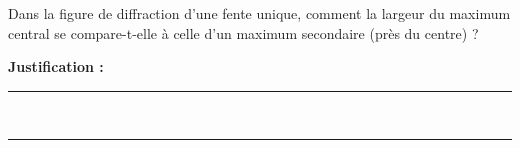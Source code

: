 Dans la figure de diffraction d'une fente unique, comment la largeur du maximum central se compare-t-elle à celle d'un maximum secondaire (près du centre) ?

\choices

\noindent\textbf{Justification :} \hrulefill \\[2.5ex]
\rule{\linewidth}{0.4pt} \\[2.5ex]
\rule{\linewidth}{0.4pt}
\vfill
